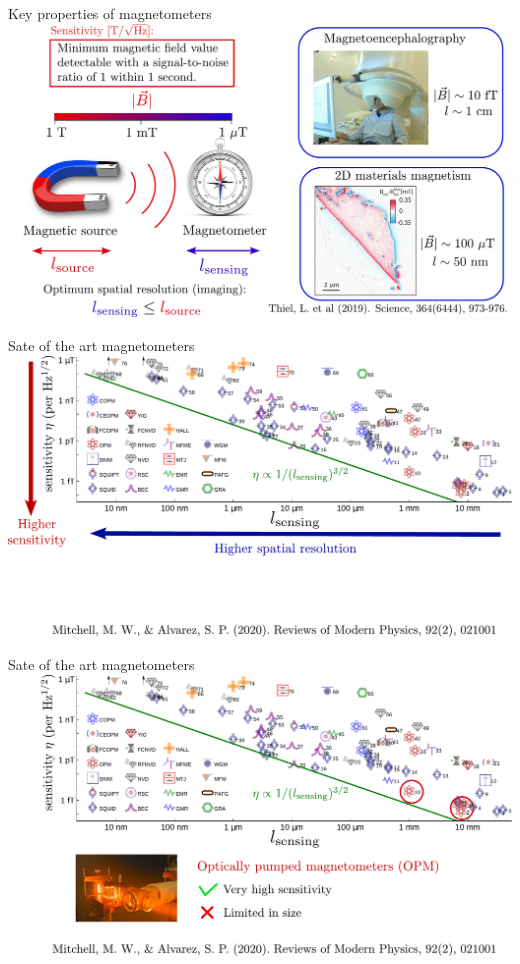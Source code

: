 \documentclass{beamer}
\begin{document}
\begin{frame}{Key properties of magnetometers}
\centering
\includegraphics[width=\textwidth,height=0.85\textheight,keepaspectratio]{Slide_magnetometer_size_f}
\end{frame}

\begin{frame}{Sate of the art magnetometers}
\centering
\includegraphics[width=\textwidth,height=0.85\textheight,keepaspectratio]{Slide_quantum_magnetometers_bare_1}
\end{frame}

\begin{frame}{Sate of the art magnetometers}
\centering
\includegraphics[width=\textwidth,height=0.85\textheight,keepaspectratio]{Slide_quantum_magnetometers_OPM}
\end{frame}
\end{document}
